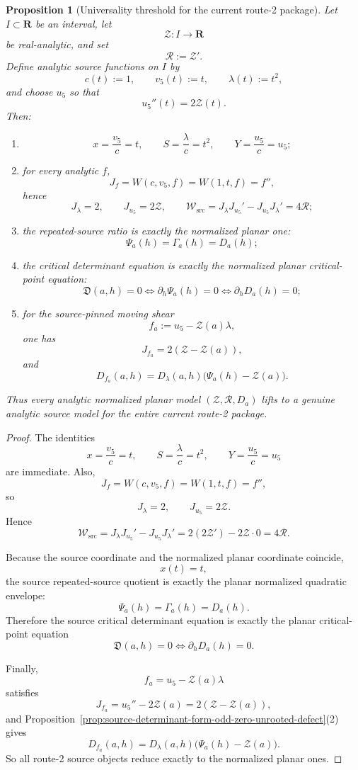 \documentclass[11pt,a4paper]{amsart}
\theoremstyle{plain}
\newtheorem{proposition}[theorem]{Proposition}
\theoremstyle{definition}
\begin{document}
\begin{proposition}[Universality threshold for the current route-2 package]
\label{prop:universality-threshold-current-route-two-package}
Let $I\subset\mathbf R$ be an interval, let
\[
\mathcal Z:I\to\mathbf R
\]
be real-analytic, and set
\[
\mathcal R:=\mathcal Z'.
\]
Define analytic source functions on $I$ by
\[
c(t):=1,\qquad v_5(t):=t,\qquad \lambda(t):=t^2,
\]
and choose $u_5$ so that
\[
u_5''(t)=2\mathcal Z(t).
\]
Then:
\begin{enumerate}
\item
\[
x=\frac{v_5}{c}=t,
\qquad
S=\frac{\lambda}{c}=t^2,
\qquad
Y=\frac{u_5}{c}=u_5;
\]

\item for every analytic $f$,
\[
J_f=W(c,v_5,f)=W(1,t,f)=f'',
\]
hence
\[
J_\lambda=2,
\qquad
J_{u_5}=2\mathcal Z,
\qquad
\mathcal W_{\mathrm{src}}
=
J_\lambda J_{u_5}'-J_{u_5}J_\lambda'
=
4\mathcal R;
\]

\item the repeated-source ratio is exactly the normalized planar one:
\[
\Psi_a(h)=\Gamma_a(h)=D_a(h);
\]

\item the critical determinant equation is exactly the normalized planar
critical-point equation:
\[
\mathfrak D(a,h)=0
\iff
\partial_h \Psi_a(h)=0
\iff
\partial_h D_a(h)=0;
\]

\item for the source-pinned moving shear
\[
f_a:=u_5-\mathcal Z(a)\lambda,
\]
one has
\[
J_{f_a}=2(\mathcal Z-\mathcal Z(a)),
\]
and
\[
D_{f_a}(a,h)=D_\lambda(a,h)\bigl(\Psi_a(h)-\mathcal Z(a)\bigr).
\]
\end{enumerate}
Thus every analytic normalized planar model $(\mathcal Z,\mathcal R,D_a)$
lifts to a genuine analytic source model for the entire current route-2 package.
\end{proposition}

\begin{proof}
The identities
\[
x=\frac{v_5}{c}=t,\qquad
S=\frac{\lambda}{c}=t^2,\qquad
Y=\frac{u_5}{c}=u_5
\]
are immediate. Also,
\[
J_f=W(c,v_5,f)=W(1,t,f)=f'',
\]
so
\[
J_\lambda=2,\qquad J_{u_5}=2\mathcal Z.
\]
Hence
\[
\mathcal W_{\mathrm{src}}
=
J_\lambda J_{u_5}'-J_{u_5}J_\lambda'
=
2(2\mathcal Z')-2\mathcal Z\cdot 0
=
4\mathcal R.
\]

Because the source coordinate and the normalized planar coordinate coincide,
\[
x(t)=t,
\]
the source repeated-source quotient is exactly the planar normalized quadratic
envelope:
\[
\Psi_a(h)=\Gamma_a(h)=D_a(h).
\]
Therefore the source critical determinant equation is exactly the planar
critical-point equation
\[
\mathfrak D(a,h)=0
\iff
\partial_h D_a(h)=0.
\]

Finally,
\[
f_a=u_5-\mathcal Z(a)\lambda
\]
satisfies
\[
J_{f_a}=u_5''-2\mathcal Z(a)=2(\mathcal Z-\mathcal Z(a)),
\]
and
Proposition~\ref{prop:source-determinant-form-odd-zero-unrooted-defect}(2)
gives
\[
D_{f_a}(a,h)=D_\lambda(a,h)\bigl(\Psi_a(h)-\mathcal Z(a)\bigr).
\]
So all route-2 source objects reduce exactly to the normalized planar ones.
\end{proof}
\end{document}
